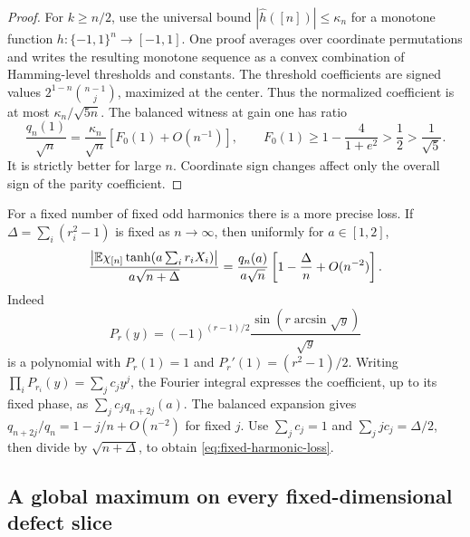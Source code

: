 \begin{proof}
For $k\ge n/2$, use the universal bound $|\widehat h([n])|\le\kappa_n$
for a monotone function $h:\{-1,1\}^n\to[-1,1]$.
One proof averages over coordinate permutations and writes the
resulting monotone sequence as a convex combination of Hamming-level
thresholds and constants. The threshold coefficients are signed values
$2^{1-n}\binom{n-1}{j}$, maximized at the center.
Thus the normalized coefficient is at most $\kappa_n/\sqrt{5n}$.
The balanced witness at gain one has ratio
\[
 \frac{q_n(1)}{\sqrt n}=\frac{\kappa_n}{\sqrt n}
 [F_0(1)+O(n^{-1})],\qquad
 F_0(1)\ge1-\frac4{1+e^2}>\frac12>\frac1{\sqrt5}.
\]
It is strictly better for large $n$. Coordinate sign changes affect
only the overall sign of the parity coefficient.
\end{proof}

For a fixed number of fixed odd harmonics there is a more precise loss.
If $\Delta=\sum_i(r_i^2-1)$ is fixed as $n\to\infty$, then uniformly
for $a\in[1,2]$,
\begin{equation}\label{eq:fixed-harmonic-loss}
 \frac{\left|\mathbb E\chi_{[n]}\tanh(a\sum_i r_iX_i)\right|}
 {a\sqrt{n+\Delta}}
 =\frac{q_n(a)}{a\sqrt n}
 \left[1-\frac\Delta n+O(n^{-2})\right].
\end{equation}
Indeed
\[
 P_r(y)=(-1)^{(r-1)/2}
        \frac{\sin(r\arcsin\sqrt y)}{\sqrt y}
\]
is a polynomial with $P_r(1)=1$ and $P_r'(1)=(r^2-1)/2$.
Writing $\prod_iP_{r_i}(y)=\sum_j c_jy^j$, the Fourier integral
expresses the coefficient, up to its fixed phase, as
$\sum_jc_jq_{n+2j}(a)$.
The balanced expansion gives
$q_{n+2j}/q_n=1-j/n+O(n^{-2})$ for fixed $j$.
Use $\sum_jc_j=1$ and $\sum_jjc_j=\Delta/2$, then divide by
$\sqrt{n+\Delta}$, to obtain \eqref{eq:fixed-harmonic-loss}.

\subsection{A global maximum on every fixed-dimensional defect slice}


